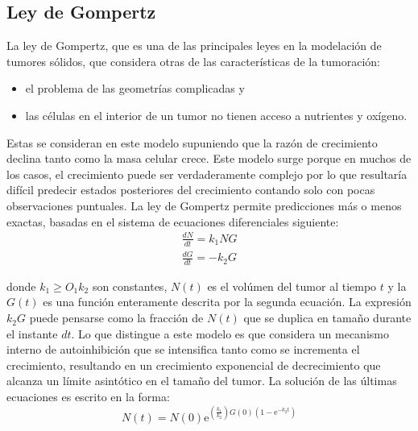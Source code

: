 \subsection{Ley de Gompertz}
La ley de Gompertz, que es una de las principales leyes en la modelación de tumores sólidos, que considera otras de las características de la tumoración:
\begin{itemize}
    \item el problema de las geometrías complicadas y
    \item las células en el interior de un tumor no tienen acceso a nutrientes y oxígeno.
\end{itemize}

Estas se consideran en este modelo supuniendo que la razón de crecimiento declina tanto como la masa celular crece. Este modelo surge porque en muchos de los casos, el crecimiento puede ser verdaderamente complejo por lo que resultaría difícil predecir estados posteriores del crecimiento contando solo con pocas observaciones puntuales. La ley de Gompertz permite predicciones más o menos exactas, basadas en el sistema de ecuaciones diferenciales siguiente:
\begin{equation}
    \begin{split}
        \frac{dN}{dt} = k_{1}NG\\
        \frac{dG}{dt} = -k_{2}G
    \end{split}
\end{equation}

donde $k_{1} \geq O_{1}k_{2}$ son constantes, $N(t)$ es el vol\'umen del tumor al tiempo $t$ y la $G(t)$ es una funci\'on enteramente descrita por la segunda ecuaci\'on. La expresión $k_{2}G$ puede pensarse como la fracción de $N(t)$ que se duplica en tamaño durante el instante $dt$. Lo que distingue a este modelo es que considera un mecanismo interno de autoinhibición que se intensifica tanto como se incrementa el crecimiento, resultando en un crecimiento exponencial de decrecimiento que alcanza un límite asintótico en el tamaño del tumor. La solución de las últimas ecuaciones es escrito en la forma:
\begin{equation}
    N(t) = N(0) \mathrm{e}^{(\frac{k_{1}}{k_{2}})G(0)(1 - \mathrm{e}^{-k_{2}t})}
\end{equation}

